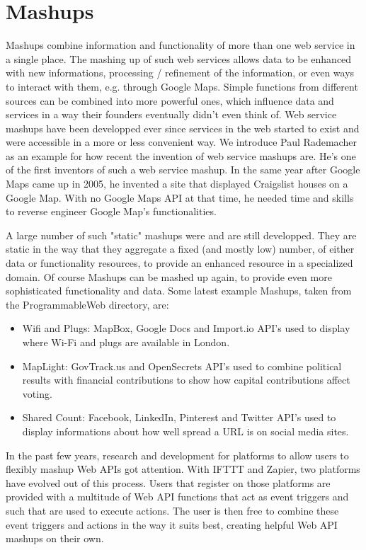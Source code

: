 \section{Mashups}
Mashups combine information and functionality of more than one web service in a single place.
The mashing up of such web services allows data to be enhanced with new informations, processing / refinement of the information, or even ways to interact with them, e.g. through Google Maps.
Simple functions from different sources can be combined into more powerful ones, which influence data and services in a way their founders eventually didn't even think of.
Web service mashups have been developped ever since services in the web started to exist and were accessible in a more or less convenient way.
We introduce Paul Rademacher as an example for how recent the invention of web service mashups are.
He's one of the first inventors of such a web service mashup.
In the same year after Google Maps came up in 2005, he invented a site\cite{wwwRademacherOne,wwwRademacherTwo} that displayed Craigslist houses on a Google Map.
With no Google Maps API at that time, he needed time and skills to reverse engineer Google Map's functionalities.


A large number of such "static" mashups were and are still developped.
They are static in the way that they aggregate a fixed (and mostly low) number, of either data or functionality resources, to provide an enhanced resource in a specialized domain.
Of course Mashups can be mashed up again, to provide even more sophisticated functionality and data.
Some latest example Mashups, taken from the ProgrammableWeb\cite{wwwProgrammableWeb} directory, are:

\begin{itemize}
  \item Wifi and Plugs\cite{wwwWifiAndPlugs}: MapBox, Google Docs and Import.io API's used to display where Wi-Fi and plugs are available in London.
  \item MapLight\cite{wwwMapLight}: GovTrack.us and OpenSecrets API's used to combine political results with financial contributions to show how capital contributions affect voting.
  \item Shared Count\cite{wwwSharedCount}: Facebook, LinkedIn, Pinterest and Twitter API's used to display informations about how well spread a URL is on social media sites.
\end{itemize}

In the past few years, research and development for platforms to allow users to flexibly mashup Web APIs got attention.
With IFTTT and Zapier, two platforms have evolved out of this process.
Users that register on those platforms are provided with a multitude of Web API functions that act as event triggers and such that are used to execute actions.
The user is then free to combine these event triggers and actions in the way it suits best, creating helpful Web API mashups on their own.

